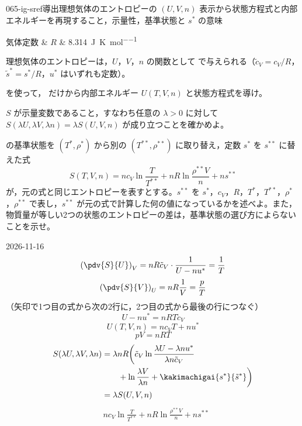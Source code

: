 \documentclass[uplatex,dvipdfmx,a4paper,11pt]{jsarticle}
\begin{document}
\begin{mondai}{065-ig-sref}{導出}{理想気体のエントロピーの $(U,V,n)$ 表示から状態方程式と内部エネルギーを再現すること，示量性，基準状態と $s^{*}$ の意味}
\begin{teisuu}
  気体定数 & $R$ & \qty{8.314}{\joule\per\kelvin\per\mole}\\
\end{teisuu}
理想気体のエントロピーは，$U$，$V$，$n$ の関数として  で与えられる（$\tilde{c}_{V} = c_{V}/R$，$\tilde{s}^{*} = s^{*}/R$，$u^{*}$ はいずれも定数）。
  \begin{shoumon}
    \item {} を使って， だけから内部エネルギー $U(T,V,n)$ と状態方程式を導け。
    \item $S$ が示量変数であること，すなわち任意の $\lambda > 0$ に対して $S(\lambda U,\lambda V,\lambda n) = \lambda S(U,V,n)$ が成り立つことを確かめよ。
    \item {} の基準状態を $(T^{*},\rho^{*})$ から別の $(T^{**},\rho^{**})$ に取り替え，定数 $s^{*}$ を $s^{**}$ に替えた式
    \[ S(T,V,n) = nc_{V}\ln\frac{T}{T^{**}} + nR\ln\frac{\rho^{**}V}{n} + ns^{**} \]
    が，元の式と同じエントロピーを表すとする。$s^{**}$ を $s^{*}$，$c_{V}$，$R$，$T^{*}$，$T^{**}$，$\rho^{*}$，$\rho^{**}$ で表し，$s^{**}$ が元の式で計算した何の値になっているかを述べよ。また，物質量が等しい2つの状態のエントロピーの差は，基準状態の選び方によらないことを示せ。
  \end{shoumon}
\begin{kotaeutsushi}{2026-11-16}
\[ \left(\pdv{S}{U}\right)_{V}=nR\tilde{c}_{V}\cdot\frac{1}{U-nu^{*}}=\frac{1}{T} \]
\[ \left(\pdv{S}{V}\right)_{U}=nR\frac{1}{V}=\frac{p}{T} \]
（矢印で1つ目の式から次の2行に，2つ目の式から最後の行につなぐ）
\[ U-nu^{*}=nRT\tilde{c}_{V} \]
\[ U(T,V,n)=nc_{V}T+nu^{*} \]
\[ pV=nRT \]
\begin{align*}
S(\lambda U,\lambda V,\lambda n)&=\lambda nR\biggl(\tilde{c}_{V}\ln\frac{\lambda U-\lambda nu^{*}}{\lambda n\tilde{c}_{V}}\\
&\qquad+\ln\frac{\lambda V}{\lambda n}+\kakimachigai{s^{*}}{\tilde{s}^{*}}\biggr)\\
&=\lambda S(U,V,n)
\end{align*}
\begin{align*}
&nc_{V}\ln\frac{T}{T^{**}}+nR\ln\frac{\rho^{**}V}{n}+ns^{**}\\

\end{align*}
\end{kotaeutsushi}
\end{mondai}
\end{document}
